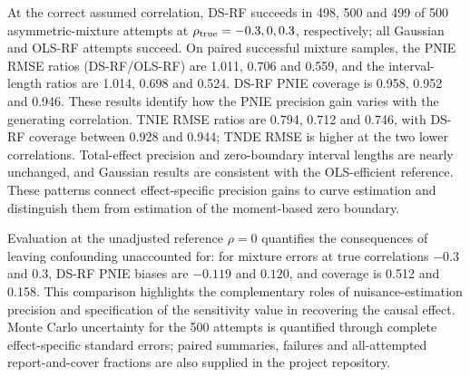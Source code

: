 At the correct assumed correlation, DS-RF succeeds in 498, 500 and 499 of 500 asymmetric-mixture attempts at $\rho_{\rm true}=-0.3,0,0.3$, respectively; all Gaussian and OLS-RF attempts succeed. On paired successful mixture samples, the PNIE RMSE ratios (DS-RF/OLS-RF) are 1.011, 0.706 and 0.559, and the interval-length ratios are 1.014, 0.698 and 0.524. DS-RF PNIE coverage is 0.958, 0.952 and 0.946. These results identify how the PNIE precision gain varies with the generating correlation. TNIE RMSE ratios are 0.794, 0.712 and 0.746, with DS-RF coverage between 0.928 and 0.944; TNDE RMSE is higher at the two lower correlations. Total-effect precision and zero-boundary interval lengths are nearly unchanged, and Gaussian results are consistent with the OLS-efficient reference. These patterns connect effect-specific precision gains to curve estimation and distinguish them from estimation of the moment-based zero boundary.

Evaluation at the unadjusted reference $\rho=0$ quantifies the consequences of leaving confounding unaccounted for: for mixture errors at true correlations $-0.3$ and $0.3$, DS-RF PNIE biases are $-0.119$ and $0.120$, and coverage is 0.512 and 0.158. This comparison highlights the complementary roles of nuisance-estimation precision and specification of the sensitivity value in recovering the causal effect. Monte Carlo uncertainty for the 500 attempts is quantified through complete effect-specific standard errors; paired summaries, failures and all-attempted report-and-cover fractions are also supplied in the project repository.
